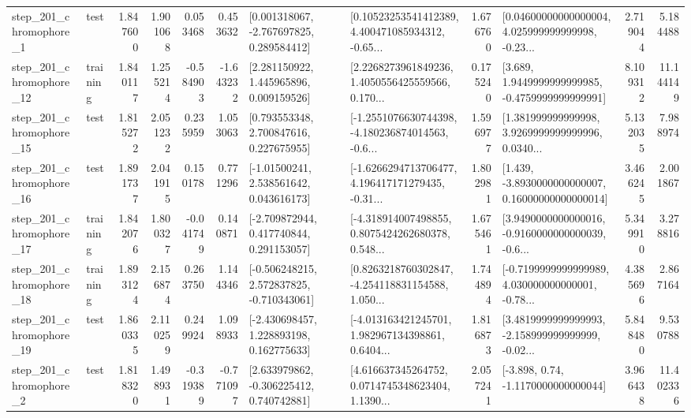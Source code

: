 \begin{tabular}{llrrrrllrlrr}
   step\_201\_chromophore\_1 &      test &      1.847600 &    1.901068 &      0.053468 &  0.453632 &    [0.001318067, -2.767697825, 0.289584412] &  [0.10523253541412389, 4.400471085934312, -0.65... &       1.676760 &  [0.04600000000000004, 4.025999999999998, -0.23... &            2.719044 &          5.184488 \\
  step\_201\_chromophore\_12 &  training &      1.840117 &    1.255214 &     -0.584903 & -1.643232 &     [2.281150922, 1.445965896, 0.009159526] &  [2.2268273961849236, 1.4050556425559566, 0.170... &       0.175240 &   [3.689, 1.9449999999999985, -0.4759999999999991] &            8.109312 &         11.144149 \\
  step\_201\_chromophore\_15 &      test &      1.815272 &    2.051232 &      0.235959 &  1.053063 &     [0.793553348, 2.700847616, 0.227675955] &  [-1.2551076630744398, -4.180236874014563, -0.6... &       1.596977 &  [1.381999999999998, 3.9269999999999996, 0.0340... &            5.132035 &          7.988974 \\
  step\_201\_chromophore\_16 &      test &      1.891737 &    2.041915 &      0.150178 &  0.771296 &     [-1.01500241, 2.538561642, 0.043616173] &  [-1.6266294713706477, 4.196417171279435, -0.31... &       1.802981 &  [1.439, -3.8930000000000007, 0.16000000000000014] &            3.466245 &          2.001867 \\
  step\_201\_chromophore\_17 &  training &      1.842076 &    1.800327 &     -0.041749 &  0.140871 &    [-2.709872944, 0.417740844, 0.291153057] &  [-4.318914007498855, 0.8075424262680378, 0.548... &       1.675461 &  [3.9490000000000016, -0.9160000000000039, -0.6... &            5.349910 &          3.278816 \\
  step\_201\_chromophore\_18 &  training &      1.893124 &    2.156874 &      0.263750 &  1.144346 &   [-0.506248215, 2.572837825, -0.710343061] &  [0.8263218760302847, -4.254118831154588, 1.050... &       1.744894 &  [-0.7199999999999989, 4.030000000000001, -0.78... &            4.385696 &          2.867164 \\
  step\_201\_chromophore\_19 &      test &      1.860335 &    2.110259 &      0.249924 &  1.098933 &    [-2.430698457, 1.228893198, 0.162775633] &  [-4.013163421245701, 1.982967134398861, 0.6404... &       1.816873 &  [3.4819999999999993, -2.158999999999999, -0.02... &            5.848480 &          9.530788 \\
   step\_201\_chromophore\_2 &      test &      1.818320 &    1.498931 &     -0.319389 & -0.771097 &    [2.633979862, -0.306225412, 0.740742881] &  [4.616637345264752, 0.0714745348623404, 1.1390... &       2.057241 &                [-3.898, 0.74, -1.1170000000000044] &            3.966438 &         11.402336 \\

\end{tabular}
